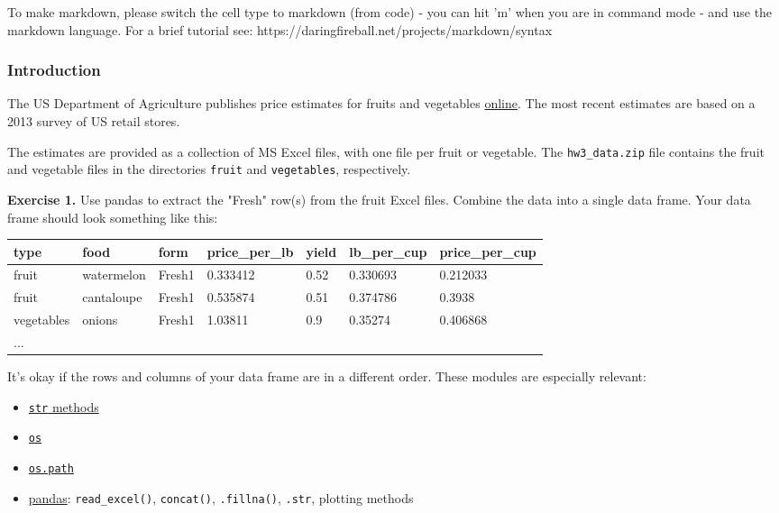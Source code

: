 \documentclass[11pt]{article}
\providecommand{\tightlist}{%
      \setlength{\itemsep}{0pt}\setlength{\parskip}{0pt}}
\begin{document}
To make markdown, please switch the cell type to markdown (from code) -
you can hit 'm' when you are in command mode - and use the markdown
language. For a brief tutorial see:
https://daringfireball.net/projects/markdown/syntax

    \subsubsection{Introduction}\label{introduction}

The US Department of Agriculture publishes price estimates for fruits
and vegetables
\href{https://www.ers.usda.gov/data-products/fruit-and-vegetable-prices/fruit-and-vegetable-prices/}{online}.
The most recent estimates are based on a 2013 survey of US retail
stores.

The estimates are provided as a collection of MS Excel files, with one
file per fruit or vegetable. The \texttt{hw3\_data.zip} file contains
the fruit and vegetable files in the directories \texttt{fruit} and
\texttt{vegetables}, respectively.

    \textbf{Exercise 1.} Use pandas to extract the "Fresh" row(s) from the
fruit Excel files. Combine the data into a single data frame. Your data
frame should look something like this:

\begin{longtable}[]{@{}lllllll@{}}
\toprule
type & food & form & price\_per\_lb & yield & lb\_per\_cup &
price\_per\_cup\tabularnewline
\midrule
\endhead
fruit & watermelon & Fresh1 & 0.333412 & 0.52 & 0.330693 &
0.212033\tabularnewline
fruit & cantaloupe & Fresh1 & 0.535874 & 0.51 & 0.374786 &
0.3938\tabularnewline
vegetables & onions & Fresh1 & 1.03811 & 0.9 & 0.35274 &
0.406868\tabularnewline
... & & & & & &\tabularnewline
\bottomrule
\end{longtable}

It's okay if the rows and columns of your data frame are in a different
order. These modules are especially relevant:

\begin{itemize}
\tightlist
\item
  \href{https://docs.python.org/2/library/stdtypes.html\#string-methods}{\texttt{str}
  methods}
\item
  \href{https://docs.python.org/2/library/os.html}{\texttt{os}}
\item
  \href{https://docs.python.org/2/library/os.path.html}{\texttt{os.path}}
\item
  \href{http://pandas.pydata.org/pandas-docs/stable/}{pandas}:
  \texttt{read\_excel()}, \texttt{concat()}, \texttt{.fillna()},
  \texttt{.str}, plotting methods
\end{itemize}
\end{document}
